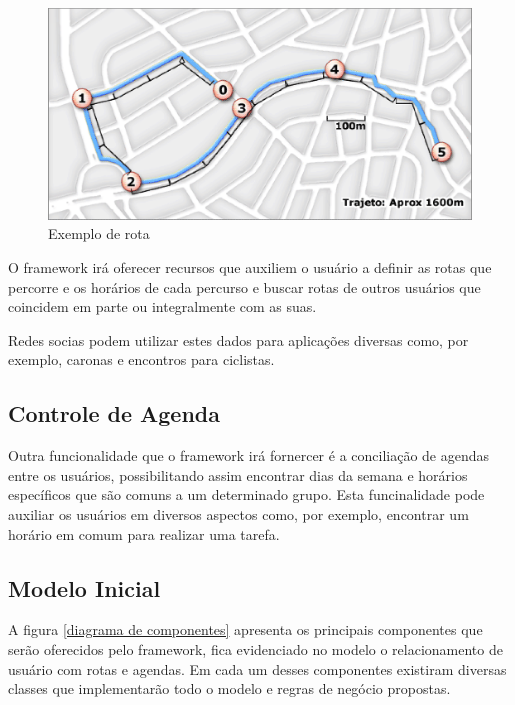 \newpage

\begin{figure}[!h]
	\centering
	\includegraphics[scale=0.55]{figuras/capitulo5/rota.eps}
	\caption[Exemplo de rota]{Exemplo de rota\footnotemark}
	\label{rota}
\end{figure}

O framework irá oferecer recursos que auxiliem o usuário a definir as rotas que percorre e os horários de cada percurso e buscar rotas de outros usuários que coincidem em parte ou integralmente com as suas.

Redes socias podem utilizar estes dados para aplicações diversas como, por exemplo, caronas e encontros para ciclistas.

\subsection{Controle de Agenda}

Outra funcionalidade que o framework irá fornercer é a conciliação de agendas entre os usuários, possibilitando assim encontrar dias da semana e horários específicos que são comuns a um determinado grupo. Esta funcinalidade pode auxiliar os usuários em diversos aspectos como, por exemplo, encontrar um horário em comum para realizar uma tarefa.

\subsection{Modelo Inicial}

A figura \ref{diagrama de componentes} apresenta os principais componentes que serão oferecidos pelo framework, fica evidenciado no modelo o relacionamento de usuário com rotas e agendas. Em cada um desses componentes existiram diversas classes que implementarão todo o modelo e regras de negócio propostas.

